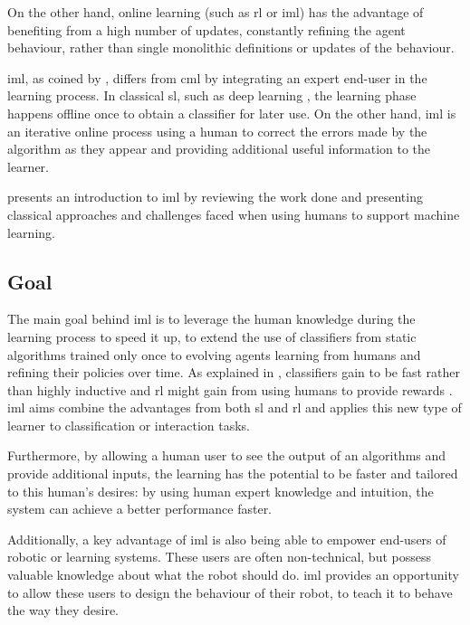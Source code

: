On the other hand, online learning (such as \gls{rl} or \gls{iml}) has the advantage of benefiting from a high number of updates, constantly refining the agent behaviour, rather than single monolithic definitions or updates of the behaviour. 

\acrfull{iml}, as coined by \cite{fails2003interactive}, differs from \gls{cml} by integrating an expert end-user in the learning process. In classical \gls{sl}, such as deep learning \citep{lecun2015deep}, the learning phase happens offline once to obtain a classifier for later use. On the other hand, \gls{iml} is an iterative online process using a human to correct the errors made by the algorithm as they appear and providing additional useful information to the learner.

\cite{amershi2014power} presents an introduction to \gls{iml} by reviewing the work done and presenting classical approaches and challenges faced when using humans to support machine learning.

\subsection{Goal}

The main goal behind \gls{iml} is to leverage the human knowledge during the learning process to speed it up, to extend the use of classifiers from static algorithms trained only once to evolving agents learning from humans and refining their policies over time. As explained in \cite{fails2003interactive}, classifiers gain to be fast rather than highly inductive and \gls{rl} might gain from using humans to provide rewards \citep{knox2009interactively}. \gls{iml} aims combine the advantages from both \gls{sl} and \gls{rl} and applies this new type of learner to classification or interaction tasks.

Furthermore, by allowing a human user to see the output of an algorithms and provide additional inputs, the learning has the potential to be faster and tailored to this human's desires: by using human expert knowledge and intuition, the system can achieve a better performance faster.

Additionally, a key advantage of \gls{iml} is also being able to empower end-users of robotic or learning systems. These users are often non-technical, but possess valuable knowledge about what the robot should do. \gls{iml} provides an opportunity to allow these users to design the behaviour of their robot, to teach it to behave the way they desire.

